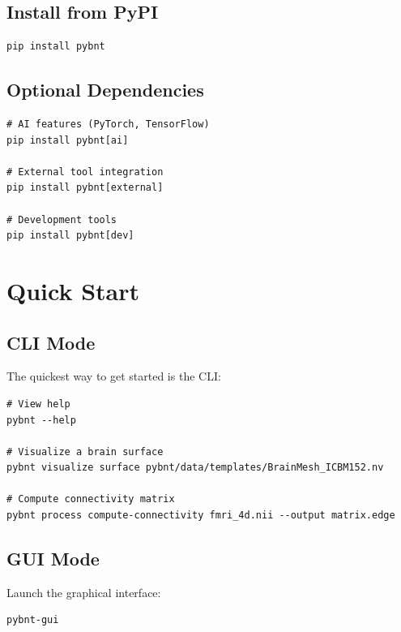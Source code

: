 \documentclass[11pt,a4paper]{article}
\begin{document}
\subsection{Install from PyPI}

\begin{lstlisting}[caption=Installation via pip]
pip install pybnt
\end{lstlisting}

\subsection{Optional Dependencies}

\begin{lstlisting}[caption=Installing optional dependencies]
# AI features (PyTorch, TensorFlow)
pip install pybnt[ai]

# External tool integration
pip install pybnt[external]

# Development tools
pip install pybnt[dev]
\end{lstlisting}

\section{Quick Start}

\subsection{CLI Mode}

The quickest way to get started is the CLI:

\begin{lstlisting}[caption=Basic CLI usage]
# View help
pybnt --help

# Visualize a brain surface
pybnt visualize surface pybnt/data/templates/BrainMesh_ICBM152.nv

# Compute connectivity matrix
pybnt process compute-connectivity fmri_4d.nii --output matrix.edge
\end{lstlisting}

\subsection{GUI Mode}

Launch the graphical interface:

\begin{lstlisting}[caption=Launching GUI]
pybnt-gui
\end{lstlisting}
\end{document}
